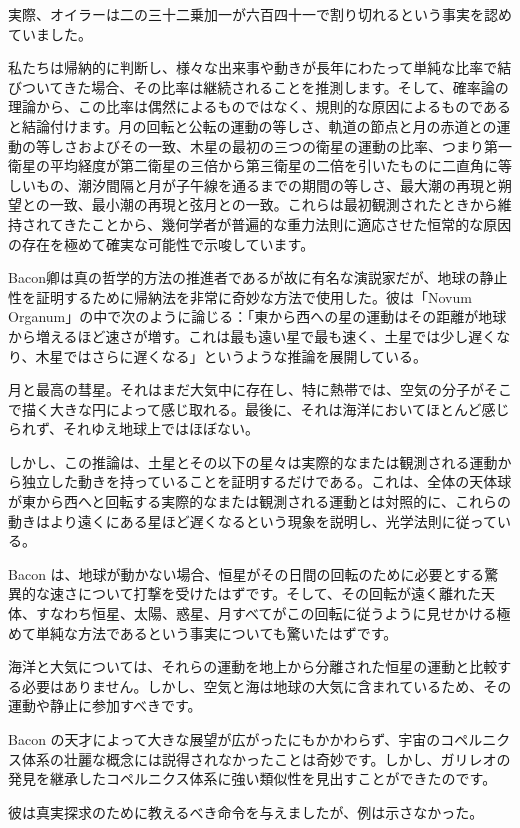 \documentclass[a4paper,11pt,openany]{ltjsbook}
\begin{document}
実際、オイラーは二の三十二乗加一が六百四十一で割り切れるという事実を認めていました。

私たちは帰納的に判断し、様々な出来事や動きが長年にわたって単純な比率で結びついてきた場合、その比率は継続されることを推測します。そして、確率論の理論から、この比率は偶然によるものではなく、規則的な原因によるものであると結論付けます。月の回転と公転の運動の等しさ、軌道の節点と月の赤道との運動の等しさおよびその一致、木星の最初の三つの衛星の運動の比率、つまり第一衛星の平均経度が第二衛星の三倍から第三衛星の二倍を引いたものに二直角に等しいもの、潮汐間隔と月が子午線を通るまでの期間の等しさ、最大潮の再現と朔望との一致、最小潮の再現と弦月との一致。これらは最初観測されたときから維持されてきたことから、幾何学者が普遍的な重力法則に適応させた恒常的な原因の存在を極めて確実な可能性で示唆しています。

Bacon卿は真の哲学的方法の推進者であるが故に有名な演説家だが、地球の静止性を証明するために帰納法を非常に奇妙な方法で使用した。彼は「Novum Organum」の中で次のように論じる：「東から西への星の運動はその距離が地球から増えるほど速さが増す。これは最も遠い星で最も速く、土星では少し遅くなり、木星ではさらに遅くなる」というような推論を展開している。

月と最高の彗星。それはまだ大気中に存在し、特に熱帯では、空気の分子がそこで描く大きな円によって感じ取れる。最後に、それは海洋においてほとんど感じられず、それゆえ地球上ではほぼない。

しかし、この推論は、土星とその以下の星々は実際的なまたは観測される運動から独立した動きを持っていることを証明するだけである。これは、全体の天体球が東から西へと回転する実際的なまたは観測される運動とは対照的に、これらの動きはより遠くにある星ほど遅くなるという現象を説明し、光学法則に従っている。

Bacon は、地球が動かない場合、恒星がその日間の回転のために必要とする驚異的な速さについて打撃を受けたはずです。そして、その回転が遠く離れた天体、すなわち恒星、太陽、惑星、月すべてがこの回転に従うように見せかける極めて単純な方法であるという事実についても驚いたはずです。

海洋と大気については、それらの運動を地上から分離された恒星の運動と比較する必要はありません。しかし、空気と海は地球の大気に含まれているため、その運動や静止に参加すべきです。

Bacon の天才によって大きな展望が広がったにもかかわらず、宇宙のコペルニクス体系の壮麗な概念には説得されなかったことは奇妙です。しかし、ガリレオの発見を継承したコペルニクス体系に強い類似性を見出すことができたのです。

彼は真実探求のために教えるべき命令を与えましたが、例は示さなかった。
\end{document}
